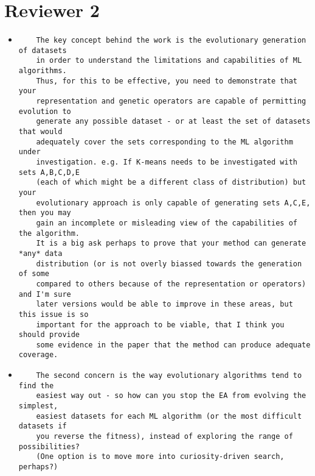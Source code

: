 \documentclass[11pt]{article}
\begin{document}
\section*{Reviewer 2}

\begin{itemize}

\item
\begin{verbatim}
    The key concept behind the work is the evolutionary generation of datasets
    in order to understand the limitations and capabilities of ML algorithms.
    Thus, for this to be effective, you need to demonstrate that your
    representation and genetic operators are capable of permitting evolution to
    generate any possible dataset - or at least the set of datasets that would
    adequately cover the sets corresponding to the ML algorithm under
    investigation. e.g. If K-means needs to be investigated with sets A,B,C,D,E
    (each of which might be a different class of distribution) but your
    evolutionary approach is only capable of generating sets A,C,E, then you may
    gain an incomplete or misleading view of the capabilities of the algorithm.
    It is a big ask perhaps to prove that your method can generate *any* data
    distribution (or is not overly biassed towards the generation of some
    compared to others because of the representation or operators) and I'm sure
    later versions would be able to improve in these areas, but this issue is so
    important for the approach to be viable, that I think you should provide
    some evidence in the paper that the method can produce adequate coverage.
\end{verbatim}

\item
\begin{verbatim}
    The second concern is the way evolutionary algorithms tend to find the
    easiest way out - so how can you stop the EA from evolving the simplest,
    easiest datasets for each ML algorithm (or the most difficult datasets if
    you reverse the fitness), instead of exploring the range of possibilities?
    (One option is to move more into curiosity-driven search, perhaps?)
\end{verbatim}

\end{itemize}
\end{document}
